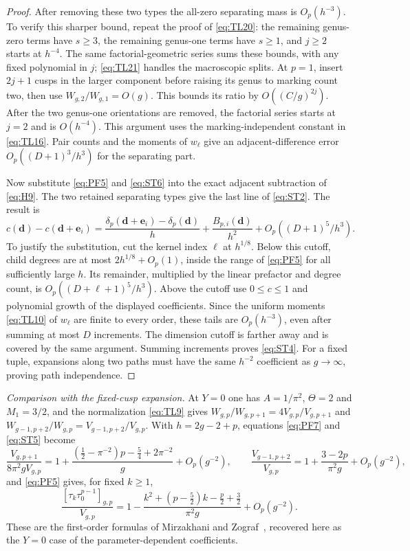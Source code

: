 \begin{proof}
After removing these two types the all-zero separating mass is
$O_p(h^{-3})$. To verify this sharper bound, repeat the proof of
\eqref{eq:TL20}: the remaining genus-zero terms have $s\ge3$, the
remaining genus-one terms have $s\ge1$, and $j\ge2$ starts at
$h^{-4}$. The same factorial-geometric series sums these bounds,
with any fixed polynomial in $j$; \eqref{eq:TL21} handles the
macroscopic splits. At $p=1$, insert $2j+1$ cusps in the larger
component before raising its genus to marking count two, then use
$W_{g,2}/W_{g,1}=O(g)$. This bounds its ratio by
$O((C/g)^{2j})$. After the two genus-one orientations are removed,
the factorial series starts at $j=2$ and is $O(h^{-4})$.
This argument uses the marking-independent constant in \eqref{eq:TL16}.
Pair counts and the moments of $w_\ell$ give an adjacent-difference
error $O_p((D+1)^3/h^3)$ for the separating part.

Now substitute \eqref{eq:PF5} and \eqref{eq:ST6} into the exact
adjacent subtraction of \eqref{eq:H9}. The two retained separating
types give the last line of \eqref{eq:ST2}. The result is
\[
 c(\mathbf d)-c(\mathbf d+\mathbf e_i)
 =\frac{\delta_p(\mathbf d+\mathbf e_i)-\delta_p(\mathbf d)}h
  +\frac{B_{p,i}(\mathbf d)}{h^2}
  +O_p((D+1)^5/h^3).
\]
To justify the substitution, cut the kernel index $\ell$ at $h^{1/8}$. Below this cutoff, child
degrees are at most $2h^{1/8}+O_p(1)$, inside the range of
\eqref{eq:PF5} for all sufficiently large $h$. Its remainder, multiplied
by the linear prefactor and degree count, is
$O_p((D+\ell+1)^5/h^3)$. Above the cutoff use $0\le c\le1$ and
polynomial growth of the displayed coefficients. Since the uniform
moments \eqref{eq:TL10} of $w_\ell$ are finite to every order, these
tails are $O_p(h^{-3})$, even after summing at most $D$ increments. The dimension cutoff is farther away and is
covered by the same argument. Summing increments proves \eqref{eq:ST4}.
For a fixed tuple, expansions along two paths must have the same
$h^{-2}$ coefficient as $g\to\infty$, proving path independence.
\end{proof}

\emph{Comparison with the fixed-cusp expansion.}
At $Y=0$ one has $A=1/\pi^2$, $\Theta=2$ and $M_1=3/2$, and the
normalization \eqref{eq:TL9} gives $W_{g,p}/W_{g,p+1}=4V_{g,p}/V_{g,p+1}$
and $W_{g-1,p+2}/W_{g,p}=V_{g-1,p+2}/V_{g,p}$. With $h=2g-2+p$,
equations \eqref{eq:PF7} and \eqref{eq:ST5} become
\[
 \frac{V_{g,p+1}}{8\pi^2gV_{g,p}}
 =1+\frac{(\frac12-\pi^{-2})p-\frac54+2\pi^{-2}}{g}+O_p(g^{-2}),
 \qquad
 \frac{V_{g-1,p+2}}{V_{g,p}}=1+\frac{3-2p}{\pi^2g}+O_p(g^{-2}),
\]
and \eqref{eq:PF5} gives, for fixed $k\ge1$,
\[
 \frac{[\tau_k\tau_0^{p-1}]_{g,p}}{V_{g,p}}
 =1-\frac{k^2+(p-\frac52)k-\frac p2+\frac32}{\pi^2g}+O_p(g^{-2}).
\]
These are the first-order formulas of Mirzakhani and
Zograf~\cite[Theorems~1.4 and~3.2(i)]{MZ}, recovered here as the
$Y=0$ case of the parameter-dependent coefficients.


